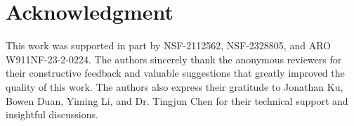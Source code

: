 \section*{Acknowledgment}

This work was supported in part by NSF-2112562, NSF-2328805, and ARO W911NF-23-2-0224. The authors sincerely thank the anonymous reviewers
for their constructive feedback and valuable suggestions that greatly
improved the quality of this work. The authors also express their gratitude to Jonathan Ku, Bowen Duan, Yiming Li, and Dr. Tingjun Chen for their technical support and insightful discussions.